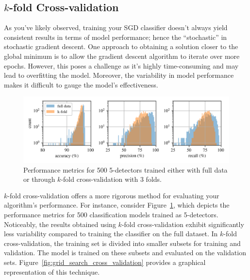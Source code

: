 \documentclass[12pt,letter]{article}
\begin{document}
\pagebreak
\subsection{$k$-fold Cross-validation}
As you've likely observed, training your SGD classifier doesn't always yield consistent results in terms of model performance; hence the ``stochastic'' in stochastic gradient descent. One approach to obtaining a solution closer to the global minimum is to allow the gradient descent algorithm to iterate over more epochs. However, this poses a challenge as it's highly time-consuming and may lead to overfitting the model. Moreover, the variability in model performance makes it difficult to gauge the model's effectiveness.

\begin{figure}[H]
    \centering
    \includegraphics[width=6.5in]{../figures/k-fold_cross-validation_trials}
    \caption{Performance metrics for 500 5-detectors trained either with full data or through $k$-fold cross-validation with 3 folds.}
    \label{fig:k-fold_cross-validation_trials}
\end{figure}

$k$-fold cross-validation offers a more rigorous method for evaluating your algorithm's performance. For instance, consider Figure~\ref{fig:k-fold_cross-validation_trials}, which depicts the performance metrics for 500 classification models trained as 5-detectors. Noticeably, the results obtained using $k$-fold cross-validation exhibit significantly less variability compared to training the classifier on the full dataset. In $k$-fold cross-validation, the training set is divided into smaller subsets for training and validation. The model is trained on these subsets and evaluated on the validation sets. Figure~\ref{fig:grid_search_cross_validation} provides a graphical representation of this technique.
\end{document}
